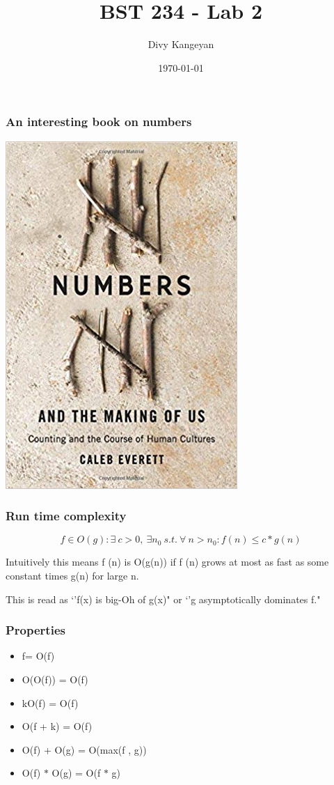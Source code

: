 \documentclass{beamer}
\title[BST 234 Lab 2]{BST 234 - Lab 2} %
\author{Divy Kangeyan} %
\institute[ ] %
{
  \\ %
\medskip
\textit{ } %
}
\date{\today}%
\begin{document}
\begin{frame}
\titlepage %
\end{frame}

 

 
 \begin{frame}
\frametitle{An interesting book on numbers}
 

 \includegraphics[width=2 in, height=3 in]{Numbers_book.jpg}

\end{frame}
 
 
 
\begin{frame}
\frametitle{Run time complexity}
 
$$f \in O(g) : \exists \ c>0, \ \exists n_{0} \ s.t. \ \forall \ n>n_{0} : f (n) \le  c*g(n)$$
 
\vspace{1.3cm}
Intuitively this means f (n) is O(g(n)) if f (n) grows at most as fast
as some constant times g(n) for large n. 


This is read as `'f(x) is big-Oh of g(x)" or `'g asymptotically dominates f."
 

\end{frame}



\begin{frame}
\frametitle{Properties}

\begin{itemize}
\item f= O(f) %
\item O(O(f)) = O(f)
\item kO(f) = O(f)
\item O(f + k) = O(f)
\item O(f) + O(g) = O(max(f , g))
\item O(f) $*$ O(g) = O(f $*$ g)
\end{itemize}

\end{frame}
\end{document}

